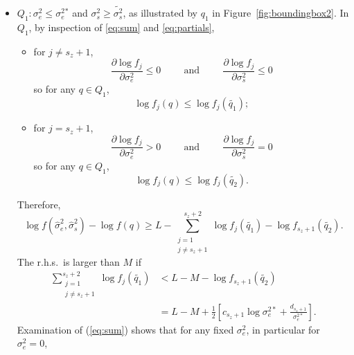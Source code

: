 \documentclass[ejs]{imsart}
\newcommand{\RL}{f}
\newcommand{\logRL}{\log\RL}
\newcommand{\sigssq}{\sigma_s^2}
\newcommand{\sigesq}{\sigma_e^2}
\newcommand{\sshat}{\hat\sigma^2_e,\hat\sigma^2_s}
\begin{document}
\begin{itemize}
\item $Q_1: \sigesq \le \sigesq{}^*$ and $\sigssq \ge \widetilde{\sigssq}$, as illustrated by $q_1$ in
  Figure~\ref{fig:boundingbox2}.  In $Q_1$, by inspection of \eqref{eq:sum} and \eqref{eq:partials},
  \begin{itemize}
  \item for $j \ne s_z+1$,
    \begin{equation*}
      \frac{\partial\logRL_j}{\partial\sigesq} \le 0 \hspace{1cm} \text{and} \hspace{1cm}
      \frac{\partial\logRL_j}{\partial\sigssq} \le 0
    \end{equation*}
    so for any $q \in Q_1$,
    \begin{equation*}
      \logRL_j(q) \le \logRL_j(\widetilde{q_1});
    \end{equation*}
  \item  for $j = s_z+1$,
    \begin{equation*}
      \frac{\partial\logRL_j}{\partial\sigesq} > 0 \hspace{1cm} \text{and} \hspace{1cm}
      \frac{\partial\logRL_j}{\partial\sigssq} = 0
    \end{equation*}
    so for any $q \in Q_1$,
    \begin{equation*}
      \logRL_j(q) \le \logRL_j(\widetilde{q_2}).
    \end{equation*}
  \end{itemize}
  Therefore, 
  \begin{equation}
	\logRL(\sshat) - \logRL(q) \ge L -
	  \sum_{\substack{j=1\\ j \ne s_z+1}}^{s_z+2} \logRL_j(\widetilde{q_1}) - \logRL_{s_z+1}(\widetilde{q_2}).
  \end{equation}
  The r.h.s.~is larger than $M$ if
  \begin{equation}
    \label{eq:q1}
    \begin{split}
      \sum_{\substack{j=1\\ j \ne s_z+1}}^{s_z+2} \logRL_j(\widetilde{q_1})
        &< L - M - \logRL_{s_z+1}(\widetilde{q_2})\\
        &= L - M + \frac{1}{2} \left[ c_{s_z+1}\log\sigma_e^{2*} + \frac{d_{s_z+1}}{\sigma_e^{2*}}\right].
    \end{split}
  \end{equation}
  Examination of (\ref{eq:sum}) shows that for any fixed $\sigesq$, in particular for $\sigesq=0$,

\end{itemize}
\end{document}
